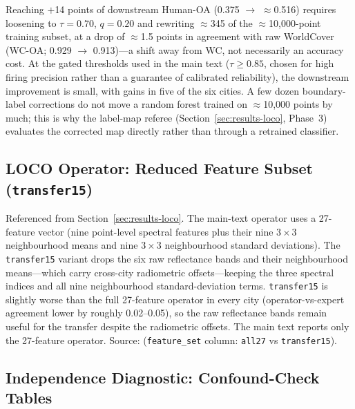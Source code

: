 \documentclass[remotesensing,article,submit,moreauthors]{Definitions/mdpi}
\begin{document}
Reaching $+$14 points of downstream Human-OA (0.375 $\to$ $\approx$0.516)
requires loosening to $\tau = 0.70$, $q = 0.20$ and rewriting $\approx$345 of
the $\approx$10,000-point training subset, at a drop of $\approx$1.5 points in
agreement with raw WorldCover (WC-OA; 0.929 $\to$ 0.913)---a shift away from
WC, not necessarily an accuracy cost.
At the gated thresholds used in the main text ($\tau \ge 0.85$, chosen for
high firing precision rather than a guarantee of calibrated reliability), the
downstream improvement is small, with gains in five of the six cities. A few
dozen boundary-label corrections do not move a random forest trained on
$\approx$10,000 points by much; this is why the label-map referee
(Section~\ref{sec:results-loco}, Phase~3) evaluates the corrected map
directly rather than through a retrained classifier.

\subsection{LOCO Operator: Reduced Feature Subset (\texttt{transfer15})}\label{app:supp-s2}

Referenced from Section~\ref{sec:results-loco}. The main-text operator uses a
27-feature vector (nine point-level spectral features plus their nine
$3\times3$ neighbourhood means and nine $3\times3$ neighbourhood standard
deviations). The \texttt{transfer15} variant drops the six raw reflectance
bands and their neighbourhood means---which carry cross-city radiometric
offsets---keeping the three spectral indices and all nine neighbourhood
standard-deviation terms. \texttt{transfer15} is slightly worse than the full
27-feature operator in every city (operator-vs-expert agreement lower by
roughly 0.02--0.05), so the raw reflectance bands remain useful for the
transfer despite the radiometric offsets. The main text reports only the
27-feature operator. Source:
(\texttt{feature\_set} column: \texttt{all27} vs \texttt{transfer15}).

\addtocounter{table}{1}

\subsection{Independence Diagnostic: Confound-Check Tables}\label{app:supp-s3}
\end{document}
